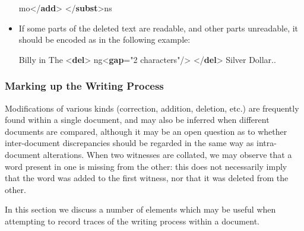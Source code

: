 \begin{itemize}
\begin{shaded}
\mbox{}\newline 
\hspace*{1em}\mbox{}\newline 
{}\mbox{}\newline 
{}mo{</\textbf{add}>}\mbox{}\newline 
{</\textbf{subst}>}ns\end{shaded}\egroup\par 
\item If some parts of the deleted text are readable, and other parts unreadable, it should be encoded as in the following example: \par\bgroup{}\exampleFont \begin{shaded}\noindent\mbox{}Billy in The {<\textbf{del}>}\mbox{}\newline 
{}ng{<\textbf{gap}\hspace*{1em}{extent}="{2 characters}"/>}\mbox{}\newline 
{</\textbf{del}>} Silver Dollar.. \end{shaded}\egroup\par 
\end{itemize} 
\subsubsection[{Marking up the Writing Process}]{Marking up the Writing Process}\label{alterations}\par
Modifications of various kinds (correction, addition, deletion, etc.) are frequently found within a single document, and may also be inferred when different documents are compared, although it may be an open question as to whether inter-document discrepancies  should be regarded in the same way as intra-document alterations. When two witnesses are collated, we may observe that a word present in one is missing from the other: this does not necessarily imply that the word was added to the first witness, nor that it was deleted from the other.\par
In this section we discuss a number of elements which may be useful when attempting to record traces of the writing process within a document. 
